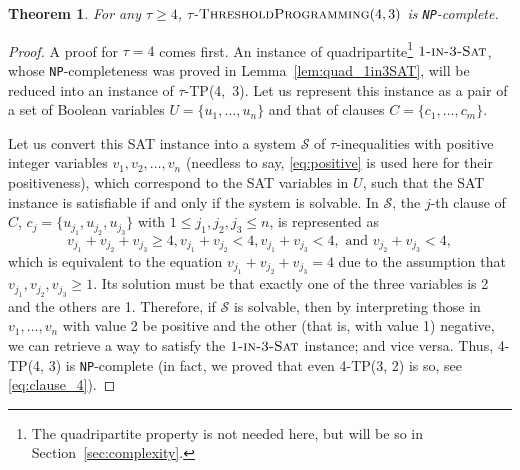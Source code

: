 \documentclass{article}
\newtheorem{theorem}{Theorem}
\theoremstyle{remark}
\theoremstyle{definition}
\newcommand{\SAT}{\ensuremath{\mbox{\sc Sat}}}
\newcommand{\oneinthree}{\ensuremath{\mbox{\sc 1-in-3-\SAT}}}
\newcommand{\TP}{\ensuremath{\mbox{\sc ThresholdProgramming}}}
\newcommand{\NP}{{\tt NP}}
\begin{document}
\begin{theorem}\label{thm:4TP_NP-complete}
	For any $\tau \ge 4$, $\tau$-$\TP(4, 3)$ is \NP-complete. 
\end{theorem}
\begin{proof}
	A proof for $\tau=4$ comes first.
        An instance of quadripartite\footnote{The quadripartite property is not needed here, but will be so in Section~\ref{sec:complexity}.} $\oneinthree$, whose \NP-completeness was proved in Lemma~\ref{lem:quad_1in3SAT}, will be reduced into an instance of $\tau$-TP(4,~3). 
	Let us represent this instance as a pair of a set of Boolean variables $U = \{u_1, \ldots, u_n\}$ and that of clauses $C = \{c_1, \ldots, c_m\}$. 

        Let us convert this SAT instance into a system $\mathcal{S}$ of $\tau$-inequalities with positive integer variables $v_1, v_2, \ldots, v_n$ (needless to say, \eqref{eq:positive} is used here for their positiveness), which correspond to the SAT variables in $U$, such that the SAT instance is satisfiable if and only if the system is solvable. 
        In $\mathcal{S}$, the $j$-th clause of $C$, $c_j = \{u_{j_1}, u_{j_2}, u_{j_3}\}$ with $1 \le j_1, j_2, j_3 \le n$, is represented as 
	\begin{equation}\label{eq:clause_4}
		v_{j_1} + v_{j_2} + v_{j_3} \ge 4, v_{j_1} + v_{j_2} < 4, v_{j_1} + v_{j_3} < 4, \mbox{ and } v_{j_2} + v_{j_3} < 4, 
	\end{equation}
	which is equivalent to the equation $v_{j_1} + v_{j_2} + v_{j_3} = 4$ due to the assumption that $v_{j_1}, v_{j_2}, v_{j_3} \ge 1$. 
	Its solution must be that exactly one of the three variables is 2 and the others are 1.
	Therefore, if $\mathcal{S}$ is solvable, then by interpreting those in $v_1, \ldots, v_n$ with value 2 be positive and the other (that is, with value 1) negative, we can retrieve a way to satisfy the $\oneinthree$ instance; and vice versa. 
	Thus, 4-TP(4, 3) is \NP-complete (in fact, we proved that even 4-TP(3, 2) is so, see \eqref{eq:clause_4}).


\end{proof}
\end{document}
